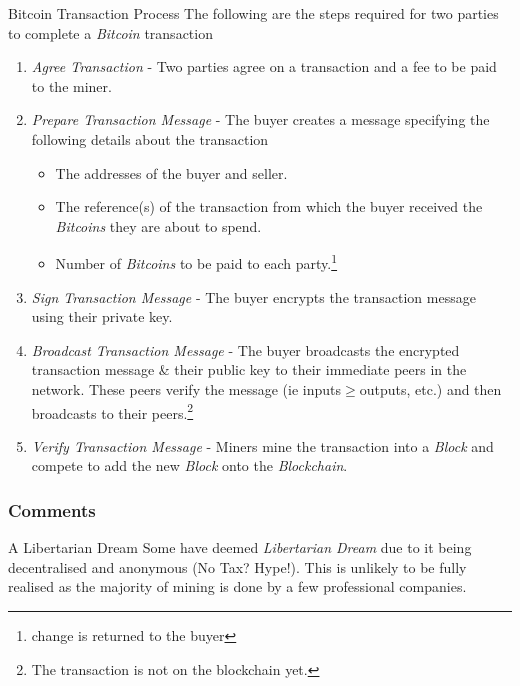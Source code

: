\documentclass[11pt,a4paper]{article}
\begin{document}
  \begin{proposition}{Bitcoin Transaction Process}
    The following are the steps required for two parties to complete a \textit{Bitcoin} transaction
    \begin{enumerate}
      \item \textit{Agree Transaction} - Two parties agree on a transaction and a fee to be paid to the miner.
      \item \textit{Prepare Transaction Message} - The buyer creates a message specifying the following details about the transaction
      \begin{itemize}
        \item The addresses of the buyer and seller.
        \item The reference(s) of the transaction from which the buyer received the \textit{Bitcoins} they are about to spend.
        \item Number of \textit{Bitcoins} to be paid to each party.\footnote{change is returned to the buyer}
      \end{itemize}
      \item \textit{Sign Transaction Message} - The buyer encrypts the transaction message using their private key.
      \item \textit{Broadcast Transaction Message} - The buyer broadcasts the encrypted transaction message \& their public key to their immediate peers in the network. These peers verify the message (ie inputs$\geq$outputs, etc.) and then broadcasts to their peers.\footnote{The transaction is not on the blockchain yet.}
      \item \textit{Verify Transaction Message} - Miners mine the transaction into a \textit{Block} and compete to add the new \textit{Block} onto the \textit{Blockchain}.
    \end{enumerate}
  \end{proposition}

\subsubsection*{Comments}

  \begin{remark}{A Libertarian Dream}
      Some have deemed \textit{Libertarian Dream} due to it being decentralised and anonymous (No Tax? Hype!). This is unlikely to be fully realised as the majority of mining is done by a few professional companies.
  \end{remark}
\end{document}
